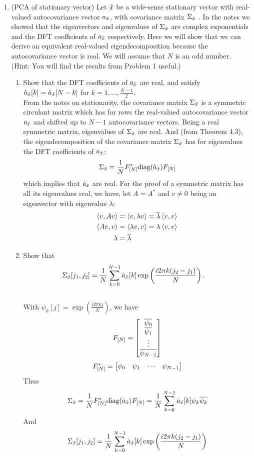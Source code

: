 \documentclass[12pt,twoside]{article}
\begin{document}
\begin{enumerate}
 \newpage
 \item (PCA of stationary vector) Let $\tilde{  x }$ be a wide-sense stationary vector with real-valued autocovariance vector $a_{\tilde{  x }}$,  with covariance matrix $\Sigma_{\tilde{  x }}$ . In the notes we showed that the eigenvectors and eigenvalues of $\Sigma_{\tilde{  x }}$ are complex exponentials and the DFT coefficients of $a_{\tilde{  x }}$ respectively. Here we will show that we can derive an equivalent real-valued eigendecomposition because the autocovariance vector is real. We will assume that $N$ is an odd number. (Hint: You will find the results from Problem 1 useful.)
 \begin{enumerate}
 \item Show that the DFT coefficients of $a_{\tilde{  x }}$ are real, and satisfy $\hat{a}_{\tilde{  x }}[k] = \hat{a}_{\tilde{  x }}[N-k]$ for $k=1,\ldots,\frac{N-1}{2}$.\\
 From the notes on stationarity, the covariance matrix $\Sigma_{\tilde{  x }}$ is a symmetric circulant matrix which has for rows the real-valued autocovariance vector $a_{\tilde{  x }}$ and shifted up to $N-1$ autocovariance vectors.
 Being a real symmetric matrix, eigenvalues of $\Sigma_{\tilde{  x }}$  are real. And (from Theorem 4.3), the eigendecomposition of the  covariance matrix $\Sigma_{\tilde{  x }}$ has for eigenvalues the DFT coefficients  of $a_{\tilde{  x }}$:
 $$\Sigma_{\tilde{  x }} = \frac{1}{N} F_{[N]}^* \text{diag}(\hat{a}_{\tilde{  x }}) F_{[N]}$$ which implies that  $\hat{a}_{\tilde{  x }}$ are real.
 For the proof of a symmetric matrix has all its eigenvalues real, we have, let $A=A^*$ and $v\neq 0$ being an eigenvector with eigenvalue $\lambda$:
 \begin{align*}
 	\left \langle v, Av\right \rangle	&= \left \langle v, \lambda v\right \rangle  = \overline{\lambda} \left \langle v, v\right \rangle  \\
 	\left \langle Av, v\right \rangle	&= \left \langle \lambda v, v\right \rangle  = \lambda \left \langle v, v\right \rangle  \\
	\lambda		&=  \overline{\lambda}
 \end{align*}
 
 \item Show that
 \begin{align}
 \Sigma_{\tilde{  x }}[j_1,j_2] & = \frac{1}{N}\sum_{k=0}^{N-1} \hat{a}_{\tilde{  x }}[k] \exp\left( \frac{i2 \pi k (j_2-j_1)}{N} \right).
 \end{align}  \\
 With $\psi_{k}[j] = \exp( \frac{i 2 \pi k j}{N} )$, we have 
 $$F_{[N]} = \begin{bmatrix} \overline{\psi_0} \\ \overline{\psi_1} \\ \vdots \\ \overline{\psi_{N-1}} \end{bmatrix}$$
 $$ F_{[N]}^* = \begin{bmatrix} \psi_0 & \psi_1 & \cdots & \psi_{N-1} \end{bmatrix}$$
 Thus
 $$\Sigma_{\tilde{  x }} =  \frac{1}{N} F_{[N]}^* \text{diag}(\hat{a}_{\tilde{  x }}) F_{[N]} =  \frac{1}{N}  \sum_{k=0}^{N-1} \hat{a}_{\tilde{  x }}[k] \psi_{k}  \overline{\psi_k}$$
 And $$\Sigma_{\tilde{  x }}[j_1,j_2] = \frac{1}{N}\sum_{k=0}^{N-1} \hat{a}_{\tilde{  x }}[k] \exp\left( \frac{i2 \pi k (j_2-j_1)}{N} \right)$$
 

\end{enumerate}
\end{enumerate}
\end{document}
